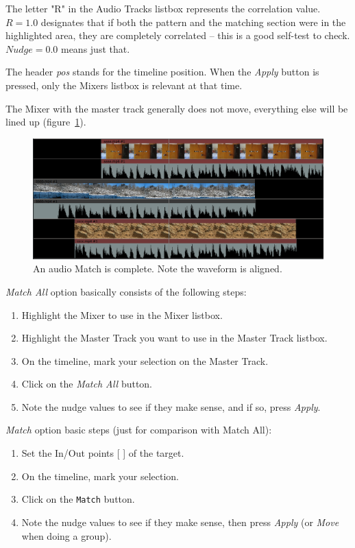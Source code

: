The letter "R" in the Audio Tracks listbox represents the correlation value.  $R=1.0$ designates that if both the pattern and the matching section were in the highlighted area, they are completely correlated -- this is a good self-test to check.
$Nudge=0.0$ means just that.

The header \textit{pos} stands for the timeline position. When the \textit{Apply} button is pressed, only the Mixers listbox is relevant at that time.

The Mixer with the master track generally does not move, everything else will be lined up (figure~\ref{fig:mixer-align04}).

\begin{figure}[htpb]
    \centering
    \includegraphics[width=0.9\linewidth]{images/mixer-align04.png}
    \caption{An audio Match is complete. Note the waveform is aligned.}
    \label{fig:mixer-align04}
\end{figure}

\textit{Match All} option basically consists of the following steps:

\begin{enumerate}
    \item Highlight the Mixer to use in the Mixer listbox.
    \item Highlight the Master Track you want to use in the Master Track listbox.
    \item On the timeline, mark your selection on the Master Track.
    \item Click on the \textit{Match All} button.
    \item Note the nudge values to see if they make sense, and if so, press \textit{Apply}.
\end{enumerate}

\textit{Match} option basic steps (just for comparison with Match All):

\begin{enumerate}
    \item Set the In/Out points [ ] of the target.
    \item On the timeline, mark your selection.
    \item Click on the \texttt{Match} button.
    \item Note the nudge values to see if they make sense, then press \textit{Apply} (or \textit{Move} when doing a group).
\end{enumerate}

